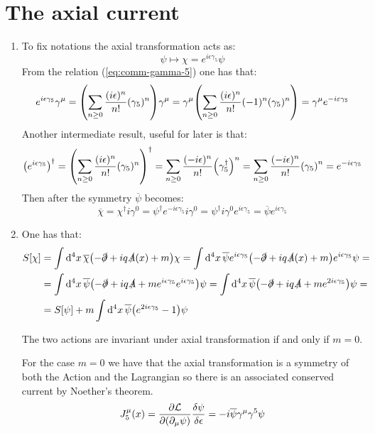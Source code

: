 \documentclass[11pt, oneside]{article}   	%
\begin{document}
\section{The axial current}

\begin{enumerate}[label=\alph*)]

\item To fix notations the axial transformation acts as:
\[
	\psi \longmapsto \chi = e^{i \epsilon \gamma_5} \psi
\]
From the relation (\ref{eq:comm-gamma-5}) one has that:
\[
	e^{i\epsilon \gamma_5} \gamma^\mu = \qty( \sum_{n\ge0} \frac{(i\epsilon)^n}{n!} (\gamma_5)^n) \gamma^\mu = \gamma^\mu \qty( \sum_{n\ge0} \frac{(i\epsilon)^n}{n!} (-1)^n (\gamma_5)^n) = \gamma^\mu e^{-i\varepsilon \gamma_5}
\]
Another intermediate result, useful for later is that:
\[
	\qty(e^{i\epsilon \gamma_5})^\dagger = \qty( \sum_{n\ge0} \frac{(i\epsilon)^n}{n!} (\gamma_5)^n )^\dagger = \sum_{n\ge0} \frac{(-i\epsilon)^n}{n!} \qty(\gamma_5^\dagger)^n = \sum_{n\ge0} \frac{(-i\epsilon)^n}{n!} \qty(\gamma_5)^n = e^{-i\epsilon \gamma_5}
\]
Then after the symmetry $\overline{\psi}$ becomes:
\[
	\overline{\chi} = \chi^\dagger i \gamma^0 = \psi^\dagger e^{-i\epsilon \gamma_5} i\gamma^0 = \psi^\dagger i \gamma^0 e^{i\epsilon \gamma_5} = \overline{\psi} e^{i\epsilon \gamma_5}
\]

\item One has that:
\begin{align*}
	S[\chi] &= \int \dd[4]{x} \overline{\chi} \qty(- \slashed{\partial} + iq \slashed{A}(x) + m ) \chi = \int \dd[4]{x} \overline{\psi} e^{i\epsilon \gamma_5} \qty(- \slashed{\partial} + iq \slashed{A}(x) + m ) e^{i \epsilon \gamma_5} \psi = \\
	&= \int \dd[4]{x} \overline{\psi} \qty( -\slashed{\partial} + iq \slashed{A} + m e^{i \epsilon \gamma_5} e^{i \epsilon \gamma_5} ) \psi = \int \dd[4]{x} \overline{\psi} \qty( -\slashed{\partial} + iq \slashed{A} + m e^{2i \epsilon \gamma_5} ) \psi = \\
	&= S[\psi] + m \int \dd[4]{x} \overline{\psi} \qty( e^{2i \epsilon \gamma_5}  - 1 ) \psi
\end{align*}

The two actions are invariant under axial transformation if and only if $m=0$.

For the case $m=0$ we have that the axial transformation is a symmetry of both the Action and the Lagrangian so there is an associated conserved current by Noether's theorem. 
\[
	J^\mu_5(x) = \pdv{\mathcal{L}}{\qty(\partial_\mu \psi)} \fdv{\psi}{\epsilon} = -i\overline{\psi} \gamma^\mu \gamma^5 \psi
\]


\end{enumerate}
\end{document}
